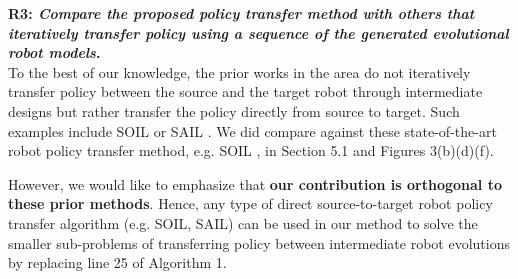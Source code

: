 \documentclass[nohyperref]{article}
\theoremstyle{plain}
\theoremstyle{definition}
\theoremstyle{remark}
\begin{document}


\textbf{\textcolor{viz_blue}{R3}: \textit{Compare the proposed policy transfer method with others that iteratively transfer policy using a sequence of the generated evolutional robot models}. } \\
To the best of our knowledge, the prior works in the area do not iteratively transfer policy between the source and the target robot through intermediate designs but rather transfer the policy directly from source to target. Such examples include SOIL \cite{soil} or SAIL \cite{sail}. We did compare against these state-of-the-art robot policy transfer method, e.g. SOIL \cite{soil}, in Section 5.1 and Figures 3(b)(d)(f).

However, we would like to emphasize that \textcolor{viz_red}{\textbf{our contribution is orthogonal to these prior methods}}. 
Hence, any type of direct source-to-target robot policy transfer algorithm (e.g. SOIL, SAIL) can be used in our method to solve the smaller sub-problems of transferring policy between intermediate robot evolutions by replacing line 25 of Algorithm 1.
\end{document}
